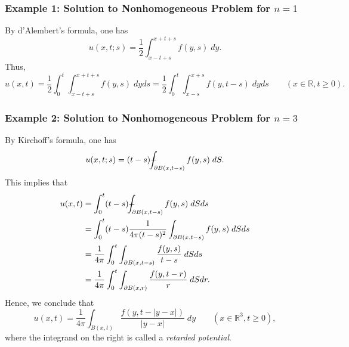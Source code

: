 \documentclass{article}
\def\Xint#1{\mathchoice
	{\XXint\displaystyle\textstyle{#1}}%
	{\XXint\textstyle\scriptstyle{#1}}%
	{\XXint\scriptstyle\scriptscriptstyle{#1}}%
	{\XXint\scriptscriptstyle\scriptscriptstyle{#1}}%
	\!\int}
\def\XXint#1#2#3{{\setbox0=\hbox{$#1{#2#3}{\int}$ }
		\vcenter{\hbox{$#2#3$ }}\kern-0.6\wd0}}
\def\dashint{\Xint-}
\begin{document}
\subsubsection{Example 1: Solution to Nonhomogeneous Problem for \texorpdfstring{$n = 1$}{n=1}}
By d'Alembert's formula, one has 
\begin{equation*}
	u(x,t;s) = \frac{1}{2}\int_{x -t + s}^{x + t + s}f(y,s)\;dy. 
\end{equation*}
Thus, 
\begin{equation*}
	u(x,t) = \frac{1}{2}\int_{0}^{t}\int_{x - t + s}^{x + t + s}f(y,s)\;dyds = \frac{1}{2}\int_0^t\int_{x - s}^{x + s}f(y,t-s)\;dyds \qquad (x \in \mathbb{R}, t \geq 0).
\end{equation*}

\subsubsection{Example 2: Solution to Nonhomogeneous Problem for \texorpdfstring{$n = 3$}{n=3}}

By Kirchoff's formula, one has 
\begin{equation*}
	u(x,t;s) = (t-s)\dashint_{\partial B(x,t -s)}f(y,s)\;dS. 
\end{equation*}
This implies that 
\begin{align*}
	\begin{split}
		u(x, t) &= \int_{0}^{t}(t - s)\dashint_{\partial B(x, t -s)}f(y,s)\;dSds \\
		&= \int_{0}^{t}(t - s)\frac{1}{4\pi(t - s)^{2}}\int_{\partial B(x, t - s)}f(y,s)\;dSds \\
		&= \frac{1}{4\pi}\int_{0}^{t}\int_{\partial B(x, t -s)}\frac{f(y,s)}{t - s}\;dSds \\
		&= \frac{1}{4\pi}\int_{0}^{t}\int_{\partial B(x,r)}\frac{f(y, t - r)}{r}\;dSdr. 
	\end{split}
\end{align*}
Hence, we conclude that 
\begin{equation*}
	u(x,t) = \frac{1}{4\pi}\int_{B(x,t)}\frac{f(y, t - |y - x|)}{|y - x|}\;dy \qquad (x \in \mathbb{R}^3, t \geq 0), 
\end{equation*}
where the integrand on the right is called a \textit{retarded potential}. 
\newpage 
\setlength{\parskip}{0pt}


\end{document}
